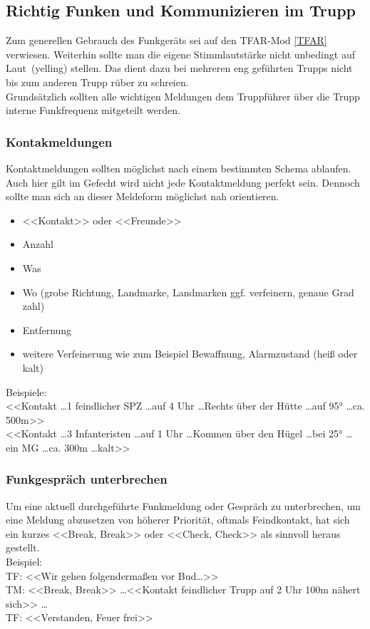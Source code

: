 \newpage
\subsection{Richtig Funken und Kommunizieren im Trupp}

	Zum generellen Gebrauch des Funkgeräts sei auf den TFAR-Mod \autoref{TFAR} verwiesen. Weiterhin sollte man die eigene Stimmlautstärke nicht unbedingt auf \glqq Laut\grqq\, (\glqq yelling\grqq) stellen. Das dient dazu bei mehreren eng geführten Trupps nicht bis zum anderen Trupp rüber zu schreien.\\
	Grundsätzlich sollten alle wichtigen Meldungen dem Truppführer über die Trupp interne Funkfrequenz mitgeteilt werden.\\

\subsubsection{Kontakmeldungen}
	Kontaktmeldungen  sollten möglichst nach einem bestimmten Schema ablaufen.  Auch hier gilt im Gefecht wird nicht jede Kontaktmeldung perfekt sein. Dennoch sollte man sich an dieser Meldeform möglichst nah orientieren.
		\begin{itemize}
		\item <<Kontakt>> oder <<Freunde>>
		\item Anzahl 
		\item Was
		\item Wo (grobe Richtung, Landmarke, Landmarken ggf. verfeinern, genaue Grad zahl) 
		\item Entfernung
		\item  weitere Verfeinerung wie zum Beispiel Bewaffnung, Alarmzustand (heiß oder kalt)
	\end{itemize}

	Beispiele:\\
	<<Kontakt \dots 1 feindlicher \acs{SPZ} \dots auf 4 Uhr \dots Rechts über der Hütte \dots auf 95° \dots ca. 500m>> \\
	<<Kontakt \dots 3 Infanteristen \dots auf 1 Uhr \dots Kommen über den Hügel \dots bei 25° \dots ein \acs{MG} \dots ca. 300m \dots kalt>> \\

\subsubsection{Funkgespräch unterbrechen}
	Um eine aktuell durchgeführte Funkmeldung oder Gespräch zu unterbrechen, um eine Meldung abzusetzen von höherer Priorität, oftmals Feindkontakt, hat sich ein kurzes <<Break, Break>> oder <<Check, Check>> als sinnvoll heraus gestellt. \\
	Beispiel: \\
	TF: <<Wir gehen folgendermaßen vor Bud…>>  \\
	TM: <<Break, Break>> \dots <<Kontakt feindlicher Trupp auf 2 Uhr  100m nähert sich>> \dots  \\
	TF: <<Verstanden, Feuer frei>> \\

